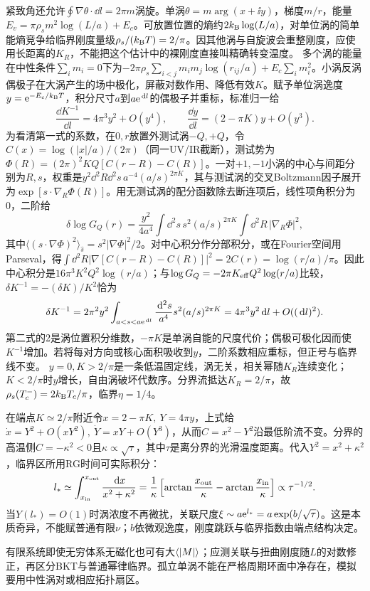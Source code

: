 紧致角还允许$\oint\nabla\theta\cdot\dd l=2\pi m$涡旋。单涡$\theta=m\arg(x+\ii y)$，梯度$m/r$，能量$E_v=\pi\rho_sm^2\log(L/a)+E_c$。可放置位置的熵约$2k_{\mathrm B}\log(L/a)$，对单位涡的简单能熵竞争给临界刚度量级$\rho_s/(k_{\mathrm B} T)=2/\pi$。因其他涡与自旋波会重整刚度，应使用长距离的$K_R$，不能把这个估计中的裸刚度直接叫精确转变温度。
多个涡的能量在中性条件$\sum_im_i=0$下为$-2\pi\rho_s\sum_{i<j}m_im_j\log(r_{ij}/a)+E_c\sum_im_i^2$。小涡反涡偶极子在大涡产生的场中极化，屏蔽对数作用、降低有效$K$。赋予单位涡逸度$y=\mathrm e^{-E_c/k_{\mathrm B} T}$，积分尺寸$a$到$a\mathrm e^{\,\mathrm d l}$的偶极子并重标，标准归一给
\begin{equation}
\frac{\dd K^{-1}}{\dd l}=4\pi^3y^2+O(y^4),\qquad\frac{\dd y}{\dd l}=(2-\pi K)y+O(y^3).
\end{equation}
为看清第一式的系数，在$0,r$放置外测试涡$-Q,+Q$，令$C(x)=\log(|x|/a)/(2\pi)$（同一UV/IR截断），测试势为$\Phi(R)=(2\pi)^2KQ[C(r-R)-C(R)]$。一对$+1,-1$小涡的中心与间距分别为$R,s$，权重是$y^2\dd^2R\dd^2s\,a^{-4}(a/s)^{2\pi K}$，其与测试涡的交叉Boltzmann因子展开为$\exp[s\cdot\nabla_R\Phi(R)]$。用无测试涡的配分函数除去断连项后，线性项角积分为0，二阶给
\begin{equation}
\delta\log G_Q(r)=\frac{y^2}{4a^4}\int\dd^2s\,s^2(a/s)^{2\pi K}
\int\dd^2R\,|\nabla_R\Phi|^2,
\end{equation}
其中$\langle(s\cdot\nabla\Phi)^2\rangle_{\hat s}=s^2|\nabla\Phi|^2/2$。对中心积分作分部积分，或在Fourier空间用Parseval，得$\int\dd^2R|\nabla[C(r-R)-C(R)]|^2=2C(r)=\log(r/a)/\pi$。因此中心积分是$16\pi^3K^2Q^2\log(r/a)$；与$\log G_Q=-2\pi K_{\rm eff}Q^2\log(r/a)$比较，$\delta K^{-1}=-(\delta K)/K^2$恰为
\begin{equation}
\delta K^{-1}=2\pi^2y^2\int_{a<s<a\mathrm e^{\,\mathrm d l}}
\frac{\,\mathrm d^2s}{a^4}s^2(a/s)^{2\pi K}
=4\pi^3y^2\,\mathrm d l+O((\,\mathrm d l)^2).
\end{equation}
第二式的2是涡位置积分维数，$-\pi K$是单涡自能的尺度代价；偶极可极化因而使$K^{-1}$增加。若将每对方向或核心面积吸收到$y$，二阶系数相应重标，但正号与临界线不变。
$y=0,K>2/\pi$是一条低温固定线，涡无关，相关幂随$K_R$连续变化；$K<2/\pi$时$y$增长，自由涡破坏代数序。分界流抵达$K_R=2/\pi$，故$\rho_s(T_c^-)=2k_{\mathrm B} T_c/\pi$，临界$\eta=1/4$。

在端点$K\simeq2/\pi$附近令$x=2-\pi K,\ Y=4\pi y$，上式给$\dot x=Y^2+O(xY^2),\ \dot Y=xY+O(Y^3)$，从而$C=x^2-Y^2$沿最低阶流不变。分界的高温侧$C=-\kappa^2<0$且$\kappa\propto\sqrt\tau$，其中$\tau$是离分界的光滑温度距离。代入$Y^2=x^2+\kappa^2$，临界区所用RG时间可实际积分：
\begin{equation}
l_*\simeq\int_{x_{\rm in}}^{x_{\rm out}}\frac{\,\mathrm d x}{x^2+\kappa^2}
=\frac1\kappa\left[\arctan\frac{x_{\rm out}}\kappa-\arctan\frac{x_{\rm in}}\kappa\right]
\propto\tau^{-1/2}.
\end{equation}
当$Y(l_*)=O(1)$时涡浓度不再微扰，关联尺度$\xi\sim a\mathrm e^{l_*}=a\exp(b/\sqrt\tau)$。这是本质奇异，不能赋普通有限$\nu$；$b$依微观逸度，刚度跳跃与临界指数由端点结构决定。

有限系统即使无穷体系无磁化也可有大$\langle |M|\rangle$；应测关联与扭曲刚度随$L$的对数修正，再区分BKT与普通幂律临界。孤立单涡不能在严格周期环面中净存在，模拟要用中性涡对或相应拓扑扇区。
